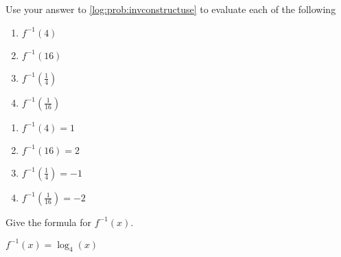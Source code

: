 \begin{exercises}
\begin{problem}
\begin{subproblem}
\begin{shortsolution}
\begin{tabular}[t]{S[table-format=1.0]S[table-format=1.0]}
		\end{tabular}
	\end{shortsolution}
\end{subproblem}
\begin{subproblem}
	Use your answer to \cref{log:prob:invconstructuse} to evaluate each of the following
	\begin{multicols}{4}
		\begin{enumerate}
			\item $f^{-1}(4)$
			\item $f^{-1}(16)$
			\item $f^{-1}\left( \frac{1}{4} \right)$
			\item $f^{-1}\left( \frac{1}{16} \right)$
		\end{enumerate}
	\end{multicols}
	\begin{shortsolution}
		\begin{enumerate}
			\item $f^{-1}(4) = 1$
			\item $f^{-1}(16)= 2$
			\item $f^{-1}\left( \frac{1}{4} \right)=-1$
			\item $f^{-1}\left( \frac{1}{16} \right)=-2$
		\end{enumerate}
	\end{shortsolution}
\end{subproblem}
\begin{subproblem}
	Give the formula for $f^{-1}(x)$.
	\begin{shortsolution}
		$f^{-1}(x)=\log_{4}(x)$ 
	\end{shortsolution}
\end{subproblem}
\end{problem}


\end{exercises}
